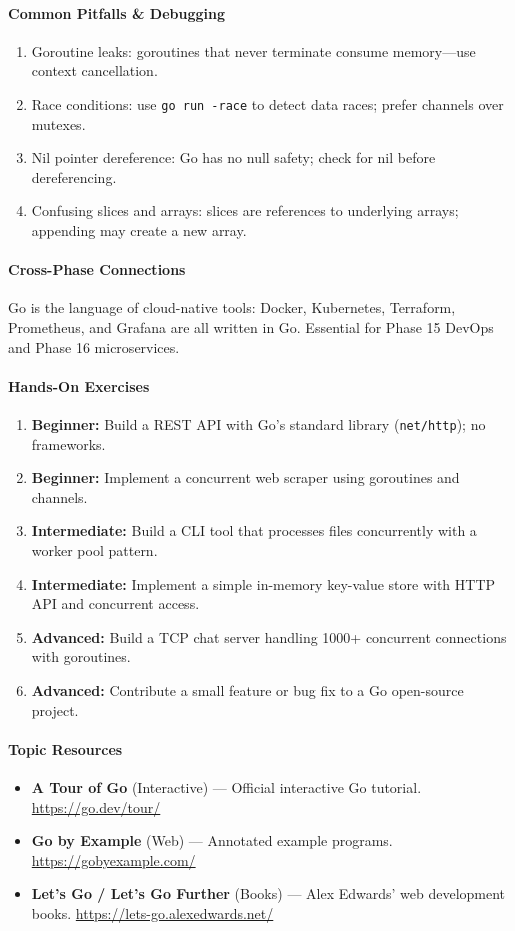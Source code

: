 \documentclass[11pt, a4paper, oneside]{report}
\begin{document}
\paragraph{Common Pitfalls \& Debugging}
\begin{enumerate}[leftmargin=*]
\item Goroutine leaks: goroutines that never terminate consume memory---use context cancellation.
\item Race conditions: use \texttt{go run -race} to detect data races; prefer channels over mutexes.
\item Nil pointer dereference: Go has no null safety; check for nil before dereferencing.
\item Confusing slices and arrays: slices are references to underlying arrays; appending may create a new array.
\end{enumerate}

\paragraph{Cross-Phase Connections} Go is the language of cloud-native tools: Docker, Kubernetes, Terraform, Prometheus, and Grafana are all written in Go. Essential for Phase 15 DevOps and Phase 16 microservices.

\paragraph{Hands-On Exercises}
\begin{enumerate}[leftmargin=*]
\item \textbf{Beginner:} Build a REST API with Go's standard library (\texttt{net/http}); no frameworks.
\item \textbf{Beginner:} Implement a concurrent web scraper using goroutines and channels.
\item \textbf{Intermediate:} Build a CLI tool that processes files concurrently with a worker pool pattern.
\item \textbf{Intermediate:} Implement a simple in-memory key-value store with HTTP API and concurrent access.
\item \textbf{Advanced:} Build a TCP chat server handling 1000+ concurrent connections with goroutines.
\item \textbf{Advanced:} Contribute a small feature or bug fix to a Go open-source project.
\end{enumerate}

\paragraph{Topic Resources}
\begin{itemize}[leftmargin=*]
\item \textbf{A Tour of Go} (Interactive) --- Official interactive Go tutorial. \url{https://go.dev/tour/}
\item \textbf{Go by Example} (Web) --- Annotated example programs. \url{https://gobyexample.com/}
\item \textbf{Let's Go / Let's Go Further} (Books) --- Alex Edwards' web development books. \url{https://lets-go.alexedwards.net/}
\end{itemize}
\end{document}
